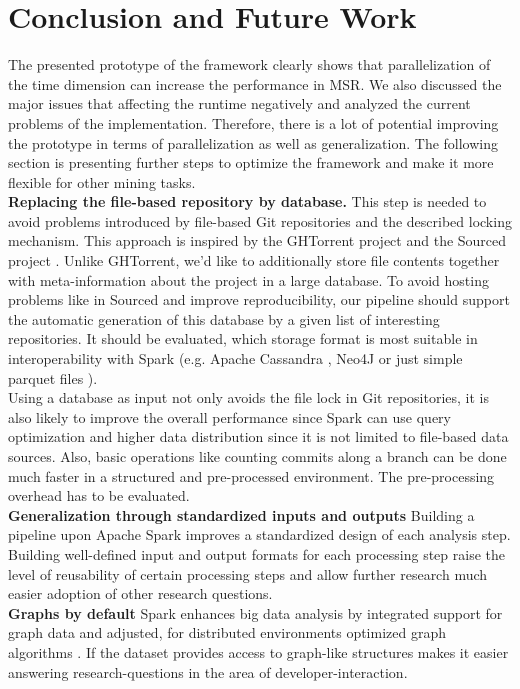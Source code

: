 
\section{Conclusion and Future Work}
\label{conclusion}
The presented prototype of the \iris framework clearly shows that parallelization of the time dimension can increase the performance in MSR. We also discussed the major issues that affecting the runtime negatively and analyzed the current problems of the implementation. Therefore, there is a lot of potential improving the prototype in terms of parallelization as well as generalization. The following section is presenting further steps to optimize the framework and make it more flexible for other mining tasks.\\
\textbf{Replacing the file-based repository by database.}
This step is needed to avoid problems introduced by file-based Git repositories and the described locking mechanism. This approach is inspired by the GHTorrent project \cite{Gousios2012, Gousios2015} and the Sourced project \cite{Markovtsev2018}. Unlike GHTorrent, we'd like to additionally store file contents together with meta-information about the project in a large database. To avoid hosting problems like in Sourced and improve reproducibility, our pipeline should support the automatic generation of this database by a given list of interesting repositories. It should be evaluated, which storage format is most suitable in interoperability with Spark (e.g. Apache Cassandra \cite{lakshman2010cassandra}, Neo4J \cite{neo4j} or just simple parquet files \cite{parquet}).\\
Using a database as input not only avoids the file lock in Git repositories, it is also likely to improve the overall performance since Spark can use query optimization and higher data distribution since it is not limited to file-based data sources. Also, basic operations like counting commits along a branch can be done much faster in a structured and pre-processed environment. The pre-processing overhead has to be evaluated.\\
\textbf{Generalization through standardized inputs and outputs} Building a pipeline upon Apache Spark improves a standardized design of each analysis step. Building well-defined input and output formats for each processing step raise the level of reusability of certain processing steps and allow further research much easier adoption of other research questions.\\
\textbf{Graphs by default} Spark enhances big data analysis by integrated support for graph data and adjusted, for distributed environments optimized graph algorithms \cite{graphx}. If the dataset provides access to graph-like structures makes it easier answering research-questions in the area of developer-interaction.\\
